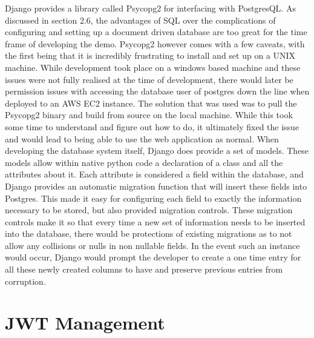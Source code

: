 Django provides a library called Psycopg2 for interfacing with PostgresQL. As discussed in section 2.6, the advantages of SQL over the complications of configuring and setting up a document driven database are too great for the time frame of developing the demo. Psycopg2 however comes with a few caveats, with the first being that it is incredibly frustrating to install and set up on a UNIX machine. While development took place on a windows based machine and these issues were not fully realised at the time of development, there would later be permission issues with accessing the database user of postgres down the line when deployed to an AWS EC2 instance. The solution that was used was to pull the Psycopg2 binary and build from source on the local machine. While this took some time to understand and figure out how to do, it ultimately fixed the issue and would lead to being able to use the web application as normal.
\newline
\newline
When developing the database system itself, Django does provide a set of models. These models allow within native python code a declaration of a class and all the attributes about it. Each attribute is considered a field within the database, and Django provides an automatic migration function that will insert these fields into Postgres. This made it easy for configuring each field to exactly the information necessary to be stored, but also provided migration controls. These migration controls make it so that every time a new set of information needs to be inserted into the database, there would be protections of existing migrations as to not allow any collisions or nulls in non nullable fields. In the event such an instance would occur, Django would prompt the developer to create a one time entry for all these newly created columns to have and preserve previous entries from corruption.

\section{JWT Management}

